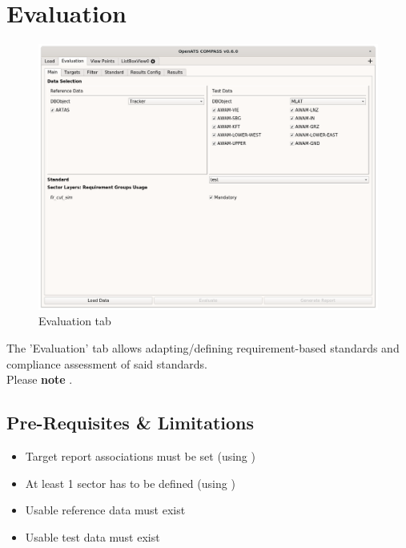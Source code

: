 \chapter{Evaluation}
\label{sec:eval} 

\begin{figure}[H]
    \hspace*{-2.5cm}
    \includegraphics[width=19cm]{../screenshots/evaluation.png}
  \caption{Evaluation tab}
\end{figure}

The 'Evaluation' tab allows adapting/defining requirement-based standards  and compliance assessment of said standards. \\

Please \textbf{note} . \\

\section{Pre-Requisites \& Limitations}
\label{sec:eval_prereq} 

\begin{itemize}  
\item Target report associations must be set (using )
\item At least 1 sector has to be defined (using )
\item Usable reference data must exist
\item Usable test data must exist
\end{itemize}
\ \\

